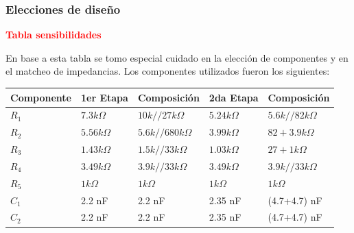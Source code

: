 \subsubsection{Elecciones de diseño}
\begin{center}
	\huge{\textcolor{red}{\textbf{Tabla sensibilidades}}}
\end{center}
En base a esta tabla se tomo especial cuidado en la elección de componentes y en el matcheo de impedancias.
Los componentes utilizados fueron los siguientes:
\begin{table}[H]
\centering
\begin{tabular}{lllll}
\multicolumn{1}{c}{Componente} & \multicolumn{1}{c}{1er Etapa} & \multicolumn{1}{c}{Composición} & 2da Etapa      & Composición           \\ \hline
$R_1$                          & $7.3 k\Omega$                 & $10k // 27k  \Omega$            & $5.24 k\Omega$ & $5.6k // 82k  \Omega$ \\
$R_2$                          & $5.56 k\Omega$                & $5.6k // 680k  \Omega$          & $3.99 k\Omega$ & $82 + 3.9k  \Omega$   \\
$R_3$                          & $1.43 k\Omega$                & $1.5 k // 33k  \Omega$          & $1.03k\Omega$  & $27 + 1k  \Omega$     \\
$R_4$                          & $3.49 k\Omega$                & $3.9k // 33k  \Omega$           & $3.49 k\Omega$ & $3.9k // 33k  \Omega$ \\
$R_5$                          & $1 k\Omega$                   & $1 k  \Omega$                   & $1 k\Omega$    & $1 k\Omega$           \\
$C_1$                          & 2.2 nF                        & 2.2 nF                          & 2.35 nF         & (4.7+4.7) nF                \\
$C_2$                          & 2.2 nF                        & 2.2 nF                          & 2.35 nF         & (4.7+4.7) nF               
\end{tabular}
\end{table}

